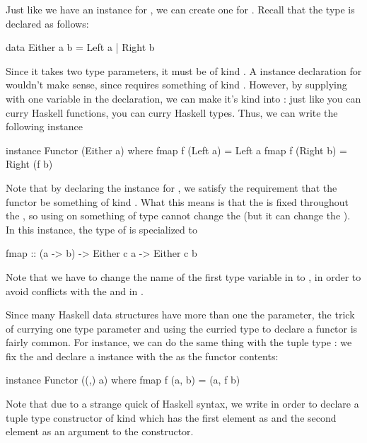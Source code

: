 Just like we have an instance for , we can create one for . Recall that
the  type is declared as follows:
\begin{haskell}
data Either a b = Left a | Right b
\end{haskell}
Since it takes two type parameters, it must be of kind \inline{* -> * -> *}. A 
instance declaration for  wouldn't make sense, since  requires
something of kind \inline{* -> *}. However, by supplying  with one variable in the
declaration, we can make it's kind into \inline{* -> *}: just like you can curry Haskell functions,
you can curry Haskell types. Thus, we can write the following instance
\begin{haskell}
instance Functor (Either a) where
  fmap f (Left a) = Left a
  fmap f (Right b) = Right (f b)
\end{haskell}
Note that by declaring the instance for , we satisfy the requirement that the
functor be something of kind \inline{* -> *}. What this means is that the  is fixed
throughout the , so using  on something of type  cannot
change the  (but it can change the ). In this instance, the type of
 is specialized to
\begin{haskell}
fmap :: (a -> b) -> Either c a -> Either c b
\end{haskell}
Note that we have to change the name of the first type variable in  to
, in order to avoid conflicts with the  and  in .

Since many Haskell data structures have more than one the parameter, the trick of currying one type
parameter and using the curried type to declare a functor is fairly common. For instance, we can do
the same thing with the tuple type : we fix the  and declare a
 instance with the  as the functor contents:
\begin{haskell}
instance Functor ((,) a) where
  fmap f (a, b) = (a, f b)
\end{haskell}
Note that due to a strange quick of Haskell syntax, we write  in order to declare a
tuple type constructor of kind \inline{* -> *} which has the first element as  and the
second element as an argument to the constructor.

